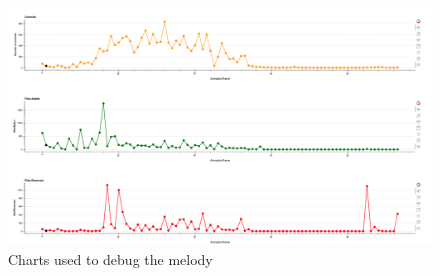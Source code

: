 \begin{figure}
    \center
    \includegraphics[width=\textwidth]{Bokeh.png}
    \caption{Charts used to debug the melody}
    \label{fig:Bokeh}
\end{figure}

